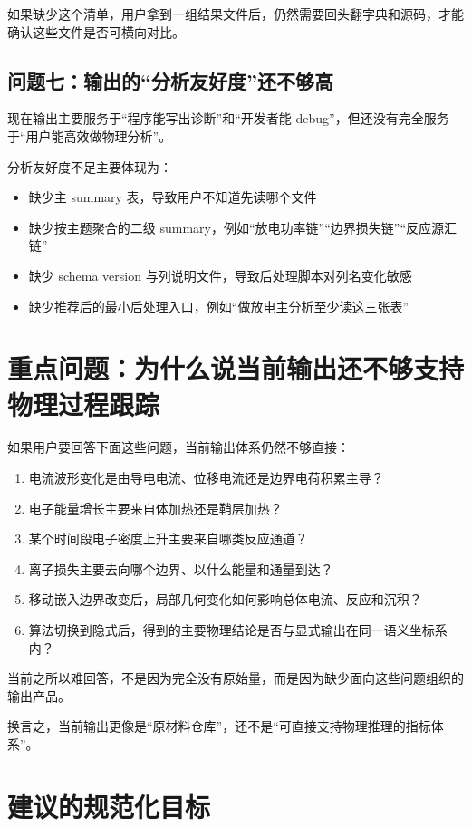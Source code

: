 \documentclass[11pt,a4paper]{ctexart}
\begin{document}
如果缺少这个清单，用户拿到一组结果文件后，仍然需要回头翻字典和源码，才能确认这些文件是否可横向对比。

\subsection{问题七：输出的“分析友好度”还不够高}

现在输出主要服务于“程序能写出诊断”和“开发者能 debug”，但还没有完全服务于“用户能高效做物理分析”。

分析友好度不足主要体现为：

\begin{itemize}
  \item 缺少主 summary 表，导致用户不知道先读哪个文件
  \item 缺少按主题聚合的二级 summary，例如“放电功率链”“边界损失链”“反应源汇链”
  \item 缺少 schema version 与列说明文件，导致后处理脚本对列名变化敏感
  \item 缺少推荐后的最小后处理入口，例如“做放电主分析至少读这三张表”
\end{itemize}

\section{重点问题：为什么说当前输出还不够支持物理过程跟踪}

如果用户要回答下面这些问题，当前输出体系仍然不够直接：

\begin{enumerate}
  \item 电流波形变化是由导电电流、位移电流还是边界电荷积累主导？
  \item 电子能量增长主要来自体加热还是鞘层加热？
  \item 某个时间段电子密度上升主要来自哪类反应通道？
  \item 离子损失主要去向哪个边界、以什么能量和通量到达？
  \item 移动嵌入边界改变后，局部几何变化如何影响总体电流、反应和沉积？
  \item 算法切换到隐式后，得到的主要物理结论是否与显式输出在同一语义坐标系内？
\end{enumerate}

当前之所以难回答，不是因为完全没有原始量，而是因为缺少面向这些问题组织的输出产品。

换言之，当前输出更像是“原材料仓库”，还不是“可直接支持物理推理的指标体系”。

\section{建议的规范化目标}
\end{document}
